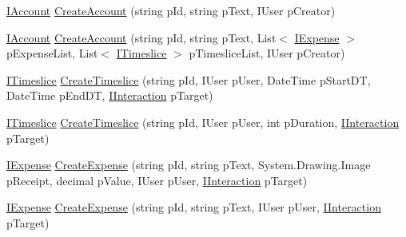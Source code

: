 \begin{DoxyCompactItemize}
\item 
\hyperlink{interface_plex_byte_1_1_mo_cap_1_1_interactions_1_1_i_account}{I\+Account} \hyperlink{interface_plex_byte_1_1_mo_cap_1_1_interactions_1_1_i_interaction_factory_ad30e523a2735f42e372375250a1dc025}{Create\+Account} (string p\+Id, string p\+Text, I\+User p\+Creator)
\item 
\hyperlink{interface_plex_byte_1_1_mo_cap_1_1_interactions_1_1_i_account}{I\+Account} \hyperlink{interface_plex_byte_1_1_mo_cap_1_1_interactions_1_1_i_interaction_factory_a4909855456dce1184abdb5dd2d8a679d}{Create\+Account} (string p\+Id, string p\+Text, List$<$ \hyperlink{interface_plex_byte_1_1_mo_cap_1_1_interactions_1_1_i_expense}{I\+Expense} $>$ p\+Expense\+List, List$<$ \hyperlink{interface_plex_byte_1_1_mo_cap_1_1_interactions_1_1_i_timeslice}{I\+Timeslice} $>$ p\+Timeslice\+List, I\+User p\+Creator)
\item 
\hyperlink{interface_plex_byte_1_1_mo_cap_1_1_interactions_1_1_i_timeslice}{I\+Timeslice} \hyperlink{interface_plex_byte_1_1_mo_cap_1_1_interactions_1_1_i_interaction_factory_aa1e654f79711cc1d747f0e10db8c98ba}{Create\+Timeslice} (string p\+Id, I\+User p\+User, Date\+Time p\+Start\+DT, Date\+Time p\+End\+DT, \hyperlink{interface_plex_byte_1_1_mo_cap_1_1_interactions_1_1_i_interaction}{I\+Interaction} p\+Target)
\item 
\hyperlink{interface_plex_byte_1_1_mo_cap_1_1_interactions_1_1_i_timeslice}{I\+Timeslice} \hyperlink{interface_plex_byte_1_1_mo_cap_1_1_interactions_1_1_i_interaction_factory_a798b46cb4aa8a6d7bcaf47038f0150dc}{Create\+Timeslice} (string p\+Id, I\+User p\+User, int p\+Duration, \hyperlink{interface_plex_byte_1_1_mo_cap_1_1_interactions_1_1_i_interaction}{I\+Interaction} p\+Target)
\item 
\hyperlink{interface_plex_byte_1_1_mo_cap_1_1_interactions_1_1_i_expense}{I\+Expense} \hyperlink{interface_plex_byte_1_1_mo_cap_1_1_interactions_1_1_i_interaction_factory_ac85fb39c0c3072a8421e4fb3b39359cd}{Create\+Expense} (string p\+Id, string p\+Text, System.\+Drawing.\+Image p\+Receipt, decimal p\+Value, I\+User p\+User, \hyperlink{interface_plex_byte_1_1_mo_cap_1_1_interactions_1_1_i_interaction}{I\+Interaction} p\+Target)
\item 
\hyperlink{interface_plex_byte_1_1_mo_cap_1_1_interactions_1_1_i_expense}{I\+Expense} \hyperlink{interface_plex_byte_1_1_mo_cap_1_1_interactions_1_1_i_interaction_factory_a0d7c926ff7b8d7c07bdc143919f3a0f7}{Create\+Expense} (string p\+Id, string p\+Text, I\+User p\+User, \hyperlink{interface_plex_byte_1_1_mo_cap_1_1_interactions_1_1_i_interaction}{I\+Interaction} p\+Target)

\end{DoxyCompactItemize}
